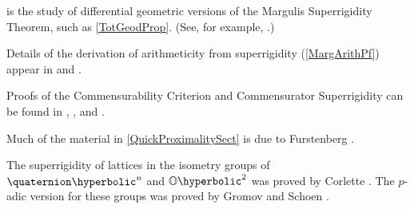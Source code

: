\begin{notes}
 is the study of differential geometric versions of the Margulis Superrigidity Theorem, such as \cref{TotGeodProp}. (See, for example, \cite{MokSiuYeung-GeomSuper}.)

Details of the derivation of arithmeticity from superrigidity (\cref{MargArithPf}) appear in \cite[Chap.~9]{MargulisBook} and \cite[\S6.1]{ZimmerBook}. 

Proofs of the Commensurability Criterion  and Commensurator Superrigidity  can be found in \cite{ACampoBurger-reseaux}, \cite[\S9.2.11, pp.~305\emph{ff}, and Thm.~7.5.4, pp.~226--227]{MargulisBook}, and \cite[\S6.2]{ZimmerBook}.

Much of the material in \cref{QuickProximalitySect} is due to Furstenberg \cite{Furstenberg-BdThyStochProc}.

The superrigidity of lattices in the isometry groups of $\quaternion\hyperbolic^n$ and $\mathbb{O}\hyperbolic^2$  was proved by Corlette \cite{Corlette-superrig}. The $p$-adic version  for these groups was proved by Gromov and Schoen \cite{GromovSchoen-padicsuper}.

\end{notes}




